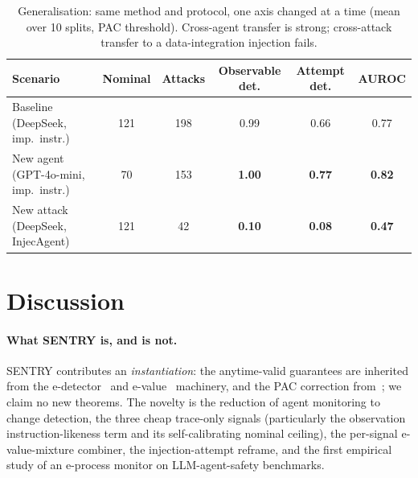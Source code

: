 \documentclass[10pt,journal,compsoc]{IEEEtran}
\newcommand{\botrule}{\bottomrule}
\theoremstyle{plain}
\theoremstyle{definition}
\begin{document}
\begin{table}[!t]
\centering
\caption{Generalisation: same method and protocol, one axis changed at a time
(mean over 10 splits, PAC threshold). Cross-agent transfer is strong;
cross-attack transfer to a data-integration injection fails.}\label{tab:gen}
\begin{tabular}{@{}lccccc@{}}
\toprule
Scenario & Nominal & Attacks & Observable det. & Attempt det. & AUROC \\
\midrule
Baseline (DeepSeek, imp.\ instr.)   & 121 & 198 & 0.99 & 0.66 & 0.77 \\
New agent (GPT-4o-mini, imp.\ instr.) & 70 & 153 & \textbf{1.00} & \textbf{0.77} & \textbf{0.82} \\
New attack (DeepSeek, InjecAgent)   & 121 & 42 & \textbf{0.10} & \textbf{0.08} & \textbf{0.47} \\
\botrule
\end{tabular}
\end{table}

\section{Discussion}\label{sec:discussion}

\paragraph{What SENTRY is, and is not.} SENTRY contributes an
\emph{instantiation}: the anytime-valid guarantees are inherited from the
e-detector~\cite{shin2023edetectors} and e-value~\cite{vovk2021evalues}
machinery, and the PAC correction from~\cite{sadhuka2025evaluator}; we claim no
new theorems. The novelty is the reduction of agent monitoring to change
detection, the three cheap trace-only signals (particularly the
observation instruction-likeness term and its self-calibrating nominal
ceiling), the per-signal e-value-mixture combiner, the injection-attempt
reframe, and the first empirical study of an e-process monitor on
LLM-agent-safety benchmarks.
\end{document}
